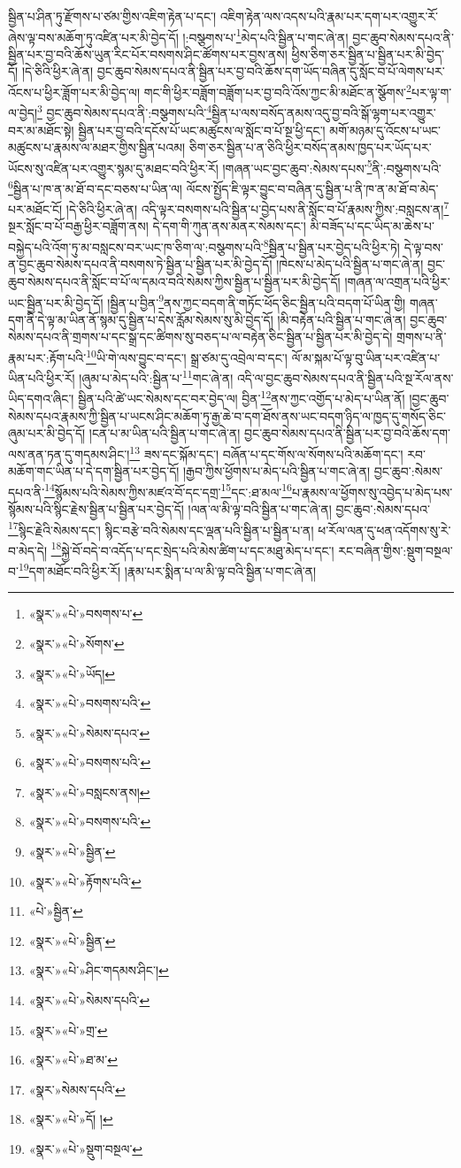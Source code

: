 སྦྱིན་པ་ཤིན་ཏུ་རྫོགས་པ་ཙམ་གྱིས་འཇིག་རྟེན་པ་དང་། འཇིག་རྟེན་ལས་འདས་པའི་རྣམ་པར་དག་པར་འགྱུར་རོ་ཞེས་ལྟ་བས་མཆོག་ཏུ་འཛིན་པར་མི་བྱེད་དོ། །:བསྩགས་པ་\footnote{«སྣར་»«པེ་»བསགས་པ་}མེད་པའི་སྦྱིན་པ་གང་ཞེ་ན། བྱང་ཆུབ་སེམས་དཔའ་ནི་སྦྱིན་པར་བྱ་བའི་ཆོས་ཡུན་རིང་པོར་བསགས་ཤིང་ཚོགས་པར་བྱས་ནས། ཕྱིས་ཅིག་ཅར་སྦྱིན་པ་སྦྱིན་པར་མི་བྱེད་དོ། །དེ་ཅིའི་ཕྱིར་ཞེ་ན། བྱང་ཆུབ་སེམས་དཔའ་ནི་སྦྱིན་པར་བྱ་བའི་ཆོས་དག་ཡོད་བཞིན་དུ་སློང་བ་པོ་ལེགས་པར་འོངས་པ་ཕྱིར་ཟློག་པར་མི་བྱེད་ལ། གང་གི་ཕྱིར་བཟློག་བཟློག་པར་བྱ་བའི་འོས་ཀྱང་མི་མཐོང་ན་སྩོགས་\footnote{«སྣར་»«པེ་»སོགས་}པར་ལྟ་ག་ལ་བྱེད།\footnote{«སྣར་»«པེ་»ཡོད།} བྱང་ཆུབ་སེམས་དཔའ་ནི་:བསྩགས་པའི་\footnote{«སྣར་»«པེ་»བསགས་པའི་}སྦྱིན་པ་ལས་བསོད་ནམས་འདུ་བྱ་བའི་སྒོ་ལྷག་པར་འགྱུར་བར་མ་མཐོང་སྟེ། སྦྱིན་པར་བྱ་བའི་དངོས་པོ་ཡང་མཚུངས་ལ་སློང་བ་པོ་སྔ་ཕྱི་དང་། མགོ་མཉམ་དུ་འོངས་པ་ཡང་མཚུངས་པ་རྣམས་ལ་མཐར་གྱིས་སྦྱིན་པའམ། ཅིག་ཅར་སྦྱིན་པ་ན་ཅིའི་ཕྱིར་བསོད་ནམས་ཁྱད་པར་ཡོད་པར་ཡོངས་སུ་འཛིན་པར་འགྱུར་སྙམ་དུ་མཐང་བའི་ཕྱིར་རོ། །གཞན་ཡང་བྱང་ཆུབ་:སེམས་དཔས་\footnote{«སྣར་»«པེ་»སེམས་དཔའ་}ནི་:བསྩགས་པའི་\footnote{«སྣར་»«པེ་»བསགས་པའི་}སྦྱིན་པ་ཁ་ན་མ་ཐོ་བ་དང་བཅས་པ་ཡིན་ལ། ལོངས་སྤྱོད་ཇི་ལྟར་བྱུང་བ་བཞིན་དུ་སྦྱིན་པ་ནི་ཁ་ན་མ་ཐོ་བ་མེད་པར་མཐོང་ངོ། །དེ་ཅིའི་ཕྱིར་ཞེ་ན། འདི་ལྟར་བསགས་པའི་སྦྱིན་པ་བྱེད་པས་ནི་སློང་བ་པོ་རྣམས་ཀྱིས་:བསླངས་ན།\footnote{«སྣར་»«པེ་»བསླངས་ནས།} སྔར་སློང་བ་པོ་བརྒྱ་ཕྱིར་བཟློག་ནས། དེ་དག་གི་ཀུན་ནས་མནར་སེམས་དང་། མི་བཟོད་པ་དང་ཡིད་མ་ཆེས་པ་བསྐྱེད་པའི་འོག་ཏུ་མ་བསླངས་བར་ཡང་ཁ་ཅིག་ལ་:བསྩགས་པའི་\footnote{«སྣར་»«པེ་»བསགས་པའི་}སྦྱིན་པ་སྦྱིན་པར་བྱེད་པའི་ཕྱིར་ཏེ། དེ་ལྟ་བས་ན་བྱང་ཆུབ་སེམས་དཔའ་ནི་བསགས་ཏེ་སྦྱིན་པ་སྦྱིན་པར་མི་བྱེད་དོ། །ཁེངས་པ་མེད་པའི་སྦྱིན་པ་གང་ཞེ་ན། བྱང་ཆུབ་སེམས་དཔའ་ནི་སློང་བ་པོ་ལ་དམའ་བའི་སེམས་ཀྱིས་སྦྱིན་པ་སྦྱིན་པར་མི་བྱེད་དོ། །གཞན་ལ་འགྲན་པའི་ཕྱིར་ཡང་སྦྱིན་པར་མི་བྱེད་དོ། །སྦྱིན་པ་བྱིན་\footnote{«སྣར་»«པེ་»སྦྱིན་}ནས་ཀྱང་བདག་ནི་གཏོང་ཕོད་ཅིང་སྦྱིན་པའི་བདག་པོ་ཡིན་གྱི། གཞན་དག་ནི་དེ་ལྟ་མ་ཡིན་ནོ་སྙམ་དུ་སྦྱིན་པ་དེས་རློམ་སེམས་སུ་མི་བྱེད་དོ། །མི་བརྟེན་པའི་སྦྱིན་པ་གང་ཞེ་ན། བྱང་ཆུབ་སེམས་དཔའ་ནི་གྲགས་པ་དང་སྒྲ་དང་ཚིགས་སུ་བཅད་པ་ལ་བརྟེན་ཅིང་སྦྱིན་པ་སྦྱིན་པར་མི་བྱེད་དེ། གྲགས་པ་ནི་རྣམ་པར་:རྟོག་པའི་\footnote{«སྣར་»«པེ་»རྟོགས་པའི་}ཡི་གེ་ལས་བྱུང་བ་དང་། སྒྲ་ཙམ་དུ་འབྲེལ་བ་དང་། ལོ་མ་སྐམ་པོ་ལྟ་བུ་ཡིན་པར་འཛིན་པ་ཡིན་པའི་ཕྱིར་རོ། །ཞུམ་པ་མེད་པའི་:སྦྱིན་པ་\footnote{«པེ་»སྦྱིན་}གང་ཞེ་ན། འདི་ལ་བྱང་ཆུབ་སེམས་དཔའ་ནི་སྦྱིན་པའི་སྔ་རོལ་ནས་ཡིད་དགའ་ཞིང་། སྦྱིན་པའི་ཚེ་ཡང་སེམས་དང་བར་བྱེད་ལ། བྱིན་\footnote{«སྣར་»«པེ་»སྦྱིན་}ནས་ཀྱང་འགྱོད་པ་མེད་པ་ཡིན་ནོ། །བྱང་ཆུབ་སེམས་དཔའ་རྣམས་ཀྱི་སྦྱིན་པ་ཡངས་ཤིང་མཆོག་ཏུ་རྒྱ་ཆེ་བ་དག་ཐོས་ནས་ཡང་བདག་ཉིད་ལ་ཁྱད་དུ་གསོད་ཅིང་ཞུམ་པར་མི་བྱེད་དོ། །ངན་པ་མ་ཡིན་པའི་སྦྱིན་པ་གང་ཞེ་ན། བྱང་ཆུབ་སེམས་དཔའ་ནི་སྦྱིན་པར་བྱ་བའི་ཆོས་དག་ལས་ནན་ཏན་དུ་གདམས་ཤིང་།\footnote{«སྣར་»«པེ་»ཤིང་གདམས་ཤིང་།} ཟས་དང་སྐོམ་དང་། བཞོན་པ་དང་གོས་ལ་སོགས་པའི་མཆོག་དང་། རབ་མཆོག་གང་ཡིན་པ་དེ་དག་སྦྱིན་པར་བྱེད་དོ། །རྒྱབ་ཀྱིས་ཕྱོགས་པ་མེད་པའི་སྦྱིན་པ་གང་ཞེ་ན། བྱང་ཆུབ་:སེམས་དཔའ་ནི་\footnote{«སྣར་»«པེ་»སེམས་དཔའི་}སྙོམས་པའི་སེམས་ཀྱིས་མཛའ་བོ་དང་དགྲ་\footnote{«སྣར་»«པེ་»གྲ་}དང་:ཐ་མལ་\footnote{«སྣར་»«པེ་»ཐ་མ་}པ་རྣམས་ལ་ཕྱོགས་སུ་འབྱེད་པ་མེད་པས་སྙོམས་པའི་སྙིང་རྗེས་སྦྱིན་པ་སྦྱིན་པར་བྱེད་དོ། །ལན་ལ་མི་ལྟ་བའི་སྦྱིན་པ་གང་ཞེ་ན། བྱང་ཆུབ་:སེམས་དཔའ་\footnote{«སྣར་»སེམས་དཔའི་}སྙིང་རྗེའི་སེམས་དང་། སྙིང་བརྩེ་བའི་སེམས་དང་ལྡན་པའི་སྦྱིན་པ་སྦྱིན་པ་ན། ཕ་རོལ་ལན་དུ་ཕན་འདོགས་སུ་རེ་བ་མེད་དེ། \footnote{«སྣར་»«པེ་»དོ། ། }སྐྱེ་བོ་བདེ་བ་འདོད་པ་དང་སྲེད་པའི་མེས་ཚིག་པ་དང་མཐུ་མེད་པ་དང་། རང་བཞིན་གྱིས་:སྡུག་བསྔལ་བ་\footnote{«སྣར་»«པེ་»སྡུག་བསྔལ་}དག་མཐོང་བའི་ཕྱིར་རོ། །རྣམ་པར་སྨིན་པ་ལ་མི་ལྟ་བའི་སྦྱིན་པ་གང་ཞེ་ན། 